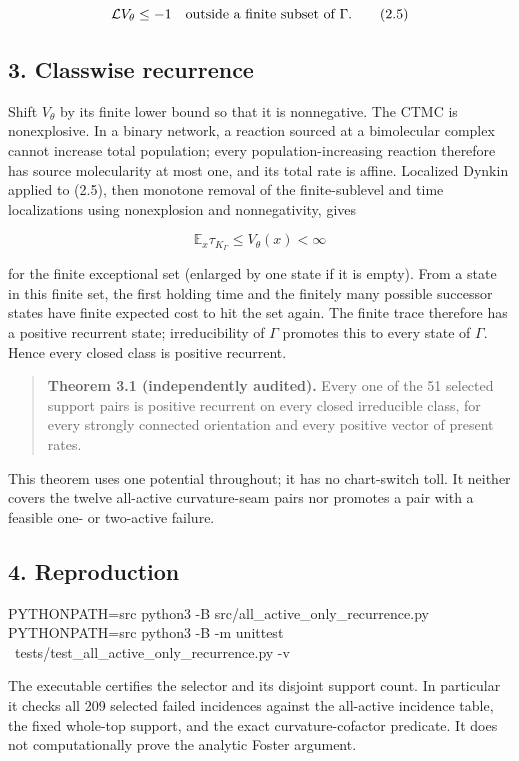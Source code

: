 \[
 {\cal L}V_\theta\le-1
 \quad\hbox{outside a finite subset of }\Gamma .         \tag{2.5}
\]

\subsection{3. Classwise recurrence}

Shift \(V_\theta\) by its finite lower bound so that it is nonnegative.
The CTMC is nonexplosive. In a binary network, a reaction sourced at a
bimolecular complex cannot increase total population; every
population-increasing reaction therefore has source molecularity at most
one, and its total rate is affine. Localized Dynkin applied to (2.5),
then monotone removal of the finite-sublevel and time localizations
using nonexplosion and nonnegativity, gives

\[
 \mathbb E_x\tau_{K_\Gamma}\le V_\theta(x)<\infty        \tag{3.1}
\]

for the finite exceptional set (enlarged by one state if it is empty).
From a state in this finite set, the first holding time and the finitely
many possible successor states have finite expected cost to hit the set
again. The finite trace therefore has a positive recurrent state;
irreducibility of \(\Gamma\) promotes this to every state of \(\Gamma\).
Hence every closed class is positive recurrent.

\begin{quote}
\textbf{Theorem 3.1 (independently audited).} Every one of the 51
selected support pairs is positive recurrent on every closed irreducible
class, for every strongly connected orientation and every positive
vector of present rates.
\end{quote}

This theorem uses one potential throughout; it has no chart-switch toll.
It neither covers the twelve all-active curvature-seam pairs nor
promotes a pair with a feasible one- or two-active failure.

\subsection{4. Reproduction}

\begin{CodeBlock}
PYTHONPATH=src python3 -B src/all_active_only_recurrence.py
PYTHONPATH=src python3 -B -m unittest \
  tests/test_all_active_only_recurrence.py -v
\end{CodeBlock}

The executable certifies the selector and its disjoint support count. In
particular it checks all 209 selected failed incidences against the
all-active incidence table, the fixed whole-top support, and the exact
curvature-cofactor predicate. It does not computationally prove the
analytic Foster argument.

